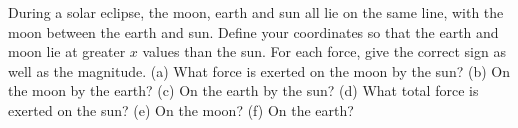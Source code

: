  During a solar eclipse, the moon, earth and sun all lie
on the same line, with the moon between the earth and sun.
Define your coordinates so that the earth and moon lie at
greater $x$ values than the sun. For each force, give the
correct sign as well as the magnitude. (a) What force is
exerted on the moon by the sun? (b) On the moon by the
earth? (c) On the earth by the sun? (d) What total force is
exerted on the sun? (e) On the moon? (f) On the earth?\answercheck
